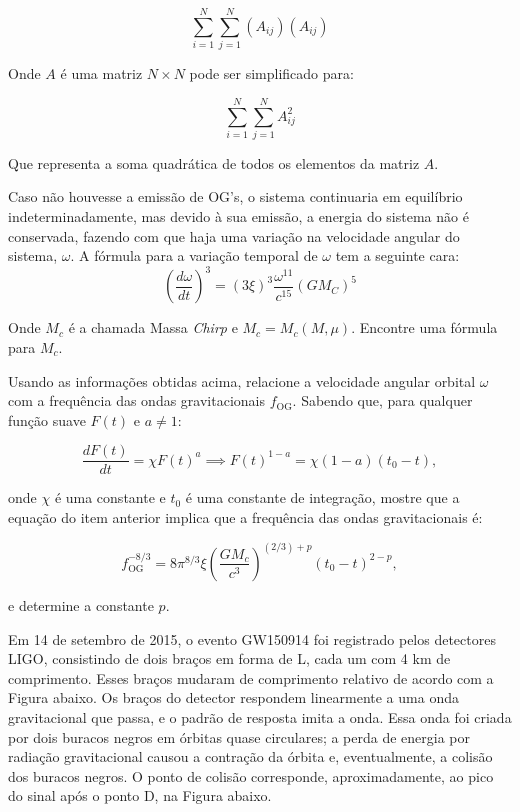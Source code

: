 \documentclass[11pt]{article}
\begin{document}
\begin{pproblem}
\begin{alternativas}
    \[\sum_{i=1}^N\sum_{j=1}^N (A_{ij})(A_{ij})\]

    Onde \(A\) é uma matriz \(N\times N\) pode ser simplificado para:

    \[\sum_{i=1}^N\sum_{j=1}^N A_{ij}^2\]

    Que representa a soma quadrática de todos os elementos da matriz \(A\).

    \item Caso não houvesse a emissão de OG's, o sistema continuaria em equilíbrio indeterminadamente, mas devido à sua emissão, a energia do sistema não é conservada, fazendo com que haja uma variação na velocidade angular do sistema, \(\omega\). A fórmula para a variação temporal de \(\omega\) tem a seguinte cara:
    \[\left(\frac{d\omega}{dt}\right)^3 = (3\xi )^3 \frac{\omega^{11}}{c^{15}}(GM_C)^5\]
    
    Onde \(M_c\) é a chamada Massa \textit{Chirp} e \(M_c = M_c(M, \mu)\). Encontre uma fórmula para \(M_c\).

    \item Usando as informações obtidas acima, relacione a velocidade angular orbital \(\omega \) com a frequência das ondas gravitacionais \( f_{\text{OG}} \). Sabendo que, para qualquer função suave \( F(t) \) e \( a \neq 1 \):

    \[
    \frac{dF(t)}{dt} = \chi F(t)^a \implies F(t)^{1-a} = \chi (1-a)(t_0 - t),
    \]
    
    onde \( \chi \) é uma constante e \( t_0 \) é uma constante de integração, mostre que a equação do item anterior implica que a frequência das ondas gravitacionais é:
    
    \[
    f_{\text{OG}}^{-8/3} = 8\pi^{8/3} \xi \left( \frac{GM_c}{c^3} \right)^{(2/3)+p} (t_0 - t)^{2-p},
    \]
    
    e determine a constante \( p \).

    Em 14 de setembro de 2015, o evento GW150914 foi registrado pelos detectores LIGO, consistindo de dois braços em forma de L, cada um com 4 km de comprimento. Esses braços mudaram de comprimento relativo de acordo com a Figura abaixo. Os braços do detector respondem linearmente a uma onda gravitacional que passa, e o padrão de resposta imita a onda. Essa onda foi criada por dois buracos negros em órbitas quase circulares; a perda de energia por radiação gravitacional causou a contração da órbita e, eventualmente, a colisão dos buracos negros. O ponto de colisão corresponde, aproximadamente, ao pico do sinal após o ponto D, na Figura abaixo.


\end{alternativas}
\end{pproblem}
\end{document}
